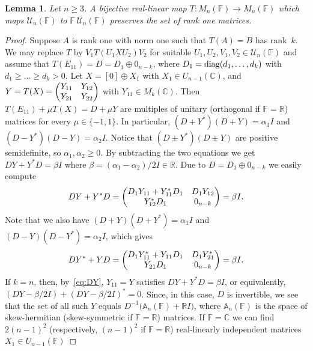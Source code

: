 \documentclass[11pt]{article}
\newtheorem{lemma}[theorem]{Lemma}
\numberwithin{equation}{section}
\def\IF{{\mathbb F}}
\def\IC{{\mathbb C}}
\def\IR{{\mathbb R}}
\def\IA{{\mathbb A}}
\def\diag{{\rm diag}}
\begin{document}
\begin{lemma}\label{lem:rk-1-reduction}
Let $n\ge 3$. A bijective real-linear map $T\colon M_n(\IF)\to M_n(\IF)$ which  maps ${\mathcal U}_n(\IF)$ to $\IF\,
{\mathcal U}_n(\IF)$ preserves the set of rank one matrices.
\end{lemma}
\begin{proof}
  Suppose $A$ is rank one with norm one such  that $T(A) = B$ has rank~$k$. We may replace
$T$ by $V_1 T(U_1 X U_2) V_2$ for suitable $U_1, U_2, V_1, V_2 \in {\mathcal U}_n(\IF)$
and assume that $T(E_{11}) =D = D_1 \oplus 0_{n-k}$, where
$D_1 = \diag(d_1, \dots, d_k)$
with $d_1\ge\dots\ge d_k > 0$.  Let $X = [0] \oplus X_1$ with $X_1 \in U_{n-1}(\IC)$, and $Y = T(X)
= \begin{pmatrix} Y_{11} & Y_{12} \cr Y_{21} & Y_{22} \cr\end{pmatrix}$ with $Y_{11} \in M_k(\IC)$.
Then $T(E_{11}) +\mu T(X) = D +\mu Y$ are multiples of unitary (orthogonal if $\IF=\IR$) matrices for every  $\mu\in\{-1,1\}$.
In particular, $(D +  Y^\ast)(D +  Y) = \alpha_1 I$
and $(D -  Y^\ast)(D -  Y) = \alpha_2 I$. Notice that $(D \pm Y^\ast)(D \pm  Y)$ are positive semidefinite, so $\alpha_1,\alpha_2\ge 0$.
By subtracting the two equations we get  $DY+Y^\ast D =\beta I$ where $\beta= (\alpha_1-\alpha_2)/2 I\in\IR$. Due to $D=D_1\oplus 0_{n-k}$ we easily compute
\begin{equation}\label{eq:DY}
DY+Y^{\ast}D =
\begin{pmatrix} D_1 Y_{11} + Y_{11}^* D_1 & D_1 Y_{12} \cr
Y_{12}^* D_1 & 0_{n-k}\cr \end{pmatrix} = \beta I.
\end{equation}
Note that we also have
$(D+Y)(D+Y^*) = \alpha_1 I$ and $(D-Y)(D-Y^*) = \alpha_2 I$, which gives
\begin{equation}\label{eq:DY*}
  DY^*+YD = \begin{pmatrix} D_1 Y_{11}^* + Y_{11} D_1 & D_1 Y_{21}^* \cr
Y_{21} D_1 & 0_{n-k}\cr \end{pmatrix} = \beta I.
\end{equation}
If $k = n$, then, by~\eqref{eq:DY}, $Y_{11} = Y$ satisfies  $DY+Y^\ast D =\beta I$, or equivalently,  $(DY-\beta/2 I)+(DY-\beta/2 I)^\ast=0$. Since, in this case, $D$ is invertible, we see that the set of all such $Y$  equals  $D^{-1}\bigl(\IA_n(\IF)+\IR I\bigr)$, where  $\IA_n(\IF)$ is the space of skew-hermitian (skew-symmetric if $\IF=\IR$) matrices.
If $\IF=\IC$ we can find  $2(n-1)^2$ (respectively, $(n-1)^2$ if $\IF=\IR$) real-linearly independent matrices $X_1 \in U_{n-1}(\IF)$

\end{proof}
\end{document}
